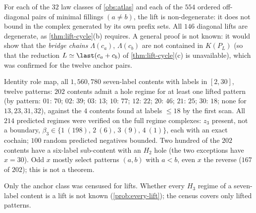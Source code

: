 \begin{observation}\label{obs:nondeg}
For each of the $32$ law classes of \cref{obs:atlas} and each of the $554$ ordered off-diagonal pairs of minimal fillings $(a\ne b)$, the lift is non-degenerate: it does not bound in the complex generated by its own prefix sets. All $146$ diagonal lifts are degenerate, as \cref{thm:lift-cycle}(b) requires. A general proof is not known: it would show that the \emph{bridge chains} $\Lambda(c_a)$, $\Lambda(c_b)$ are not contained in $K(P_L)$ (so that the reduction $L\simeq\last(c_a+c_b)$ of \cref{thm:lift-cycle}(c) is unavailable), which was confirmed for the twelve anchor pairs.
\end{observation}
\begin{observation}\label{obs:AS1}
Identity role map, all $1{,}560{,}780$ seven-label contents with labels in $[2,30]$, twelve patterns: $202$ contents admit a hole regime for at least one lifted pattern (by pattern: $01$: $70$; $02$: $39$; $03$: $13$; $10$: $77$; $12$: $22$; $20$: $46$; $21$: $25$; $30$: $18$; none for $13,23,31,32$), against the $4$ contents found at labels $\le18$ by the first scan. All $214$ predicted regimes were verified on the full regime complexes: $z_3$ present, not a boundary, $\beta_3\in\{1\ (198),\,2\ (6),\,3\ (9),\,4\ (1)\}$, each with an exact cochain; $100$ random predicted negatives bounded. Two hundred of the $202$ contents have a six-label sub-content with an $H_2$ hole (the two exceptions have $x=30$). Odd $x$ mostly select patterns $(a,b)$ with $a<b$, even $x$ the reverse ($167$ of $202$); this is not a theorem.
\end{observation}
\begin{remark}
Only the anchor class was censused for lifts. Whether every $H_3$ regime of a seven-label content is a lift is not known (\cref{prob:every-lift}); the census covers only lifted patterns.
\end{remark}

